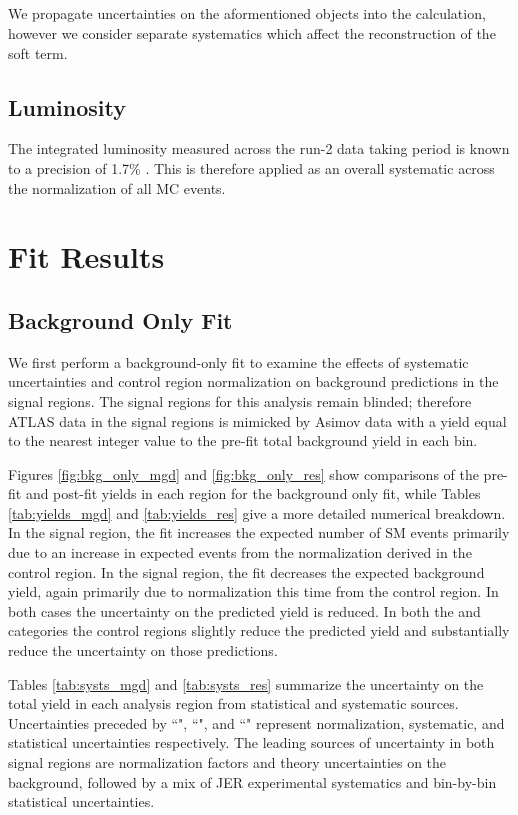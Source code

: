 \subsection{\met}
We propagate uncertainties on the aformentioned objects into the \met calculation, however we consider separate \met systematics which affect the reconstruction of the \met soft term.

\subsection{Luminosity}
The integrated luminosity measured across the run-2 data taking period is known to a precision of 1.7\% \cite{lumi_unc}. This is therefore applied as an overall systematic across the normalization of all MC events.

\section{Fit Results}
\subsection{Background Only Fit}
We first perform a background-only fit to examine the effects of systematic uncertainties and control region normalization on background predictions in the signal regions. The signal regions for this analysis remain blinded; therefore ATLAS data in the signal regions is mimicked by Asimov data with a yield equal to the nearest integer value to the pre-fit total background yield in each bin.

Figures \ref{fig:bkg_only_mgd} and \ref{fig:bkg_only_res} show comparisons of the pre-fit and post-fit yields in each region for the background only fit, while Tables \ref{tab:yields_mgd} and \ref{tab:yields_res} give a more detailed numerical breakdown. In the \merged signal region, the fit increases the expected number of SM events primarily due to an increase in expected \wjets events from the normalization derived in the \merged \wjets control region. In the \resolved signal region, the fit decreases the expected background yield, again primarily due to normalization this time from the \resolved \wjets control region. In both cases the uncertainty on the predicted \wjets yield is reduced. In both the \merged and \resolved categories the \ttbar control regions slightly reduce the predicted \ttbar yield and substantially reduce the uncertainty on those predictions.

Tables \ref{tab:systs_mgd} and \ref{tab:systs_res} summarize the uncertainty on the total yield in each analysis region from statistical and systematic sources. Uncertainties preceded by ``\mu", ``\alpha", and ``\gamma" represent normalization, systematic, and statistical uncertainties respectively. The leading sources of uncertainty in both signal regions are normalization factors and theory uncertainties on the \wjets background, followed by a mix of JER experimental systematics and bin-by-bin statistical uncertainties.

